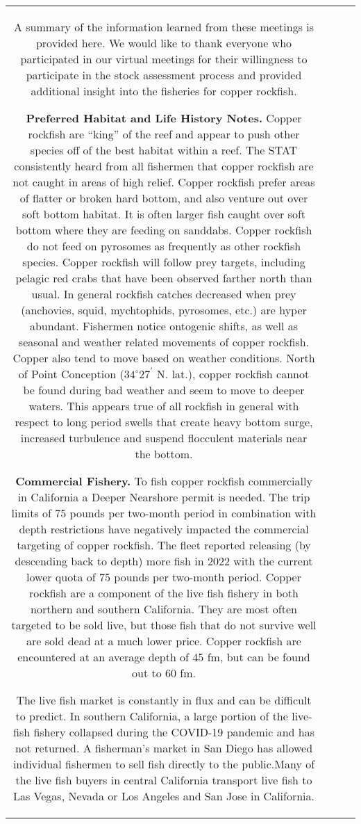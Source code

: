 \documentclass[11pt,
  letterpaper,
]{article}
\begin{document}
\begin{longtable}[t]{c>{\centering\arraybackslash}p{2cm}>{\centering\arraybackslash}p{2cm}>{\centering\arraybackslash}p{2cm}}
\begin{enumerate}
\end{enumerate}

A summary of the information learned from these meetings is provided here. We would like to thank everyone who participated in our virtual meetings for their willingness to participate in the stock assessment process and provided additional insight into the fisheries for copper rockfish.

\textbf{Preferred Habitat and Life History Notes.} Copper rockfish are ``king'' of the reef and appear to push other species off of the best habitat within a reef. The STAT consistently heard from all fishermen that copper rockfish are not caught in areas of high relief. Copper rockfish prefer areas of flatter or broken hard bottom, and also venture out over soft bottom habitat. It is often larger fish caught over soft bottom where they are feeding on sanddabs. Copper rockfish do not feed on pyrosomes as frequently as other rockfish species. Copper rockfish will follow prey targets, including pelagic red crabs that have been observed farther north than usual. In general rockfish catches decreased when prey (anchovies, squid, mychtophids, pyrosomes, etc.) are hyper abundant. Fishermen notice ontogenic shifts, as well as seasonal and weather related movements of copper rockfish. Copper also tend to move based on weather conditions. North of Point Conception ($34^\circ 27^\prime$ N. lat.), copper rockfish cannot be found during bad weather and seem to move to deeper waters. This appears true of all rockfish in general with respect to long period swells that create heavy bottom surge, increased turbulence and suspend flocculent materials near the bottom.

\textbf{Commercial Fishery.} To fish copper rockfish commercially in California a Deeper Nearshore permit is needed. The trip limits of 75 pounds per two-month period in combination with depth restrictions have negatively impacted the commercial targeting of copper rockfish. The fleet reported releasing (by descending back to depth) more fish in 2022 with the current lower quota of 75 pounds per two-month period. Copper rockfish are a component of the live fish fishery in both northern and southern California. They are most often targeted to be sold live, but those fish that do not survive well are sold dead at a much lower price. Copper rockfish are encountered at an average depth of 45 fm, but can be found out to 60 fm.

The live fish market is constantly in flux and can be difficult to predict. In southern California, a large portion of the live-fish fishery collapsed during the COVID-19 pandemic and has not returned. A fisherman's market in San Diego has allowed individual fishermen to sell fish directly to the public.Many of the live fish buyers in central California transport live fish to Las Vegas, Nevada or Los Angeles and San Jose in California.


\end{longtable}
\end{document}
